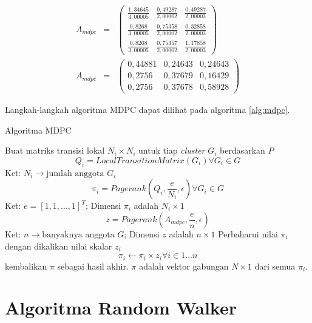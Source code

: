 \begin{align*}
	A_{mdpc} & = &
	\begin{pmatrix}
		\frac{1,34645}{3,00005} & \frac{0,49287}{2,00002} & \frac{0,49287}{2,00003} \\
		\frac{0,8268}{3,00005} & \frac{0,75358}{2,00002} & \frac{0,32858}{2,00003} \\
		\frac{0,8268}{3,00005} & \frac{0,75357}{2,00002} & \frac{1,17858}{2,00003}
	\end{pmatrix} \\
	A_{mdpc} & = &
	\begin{pmatrix}
		0,44881 & 0,24643 & 0,24643 \\
		0,2756 & 0,37679 & 0,16429 \\
		0,2756 & 0,37678 & 0,58928
	\end{pmatrix}
\end{align*}
\endgroup

Langkah-langkah algoritma MDPC dapat dilihat pada algoritma \ref{alg:mdpc}.

\begin{breakablealgorithm}
	\label{alg:mdpc}
	\caption{Algoritma MDPC}
	\begin{algorithmic}[1]
		\State Buat matriks transisi lokal $N_i \times N_i$ untuk tiap \textit{cluster} $G_i$ berdasarkan $P$ 
			\begin{equation} Q_i = LocalTransitionMatrix(G_i) \forall G_i \in G \end{equation}
			Ket:  $N_i \rightarrow \text{jumlah anggota } G_i$
		\State 
			\begin{equation} \label{alg:mdpc.step.1} \pi_i = Pagerank(Q_i, \frac{e}{N_i}, \epsilon) \forall G_i \in G \end{equation}
			Ket: $e = [1, 1, ..., 1]^T$; Dimensi $\pi_i$ adalah $N_i \times 1$ 
		\State
			\begin{equation}  z = Pagerank(A_{mdpc}, \frac{e}{n}, \epsilon) \end{equation}
			Ket: $n \rightarrow \text{banyaknya anggota }G$; Dimensi $z$ adalah $n \times 1$
		\State Perbaharui nilai $\pi_i$ dengan dikalikan nilai skalar $z_i$
			\begin{equation} \pi_i \gets \pi_i \times z_i \forall i \in 1 \ldots n \end{equation}
		\State kembalikan $\pi$ sebagai hasil akhir. $\pi$ adalah vektor gabungan $N \times 1$ dari semua $\pi_i$.
	\end{algorithmic}
\end{breakablealgorithm}

\section{Algoritma Random Walker}

